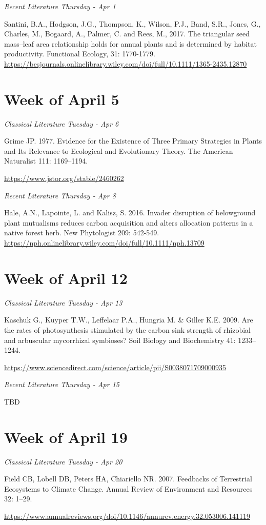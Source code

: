 \documentclass[12pt, notitlepage]{article}   	%
\begin{document}
{\textit{Recent Literature Thursday - Apr 1} \par
Santini, B.A., Hodgson, J.G., Thompson, K., Wilson, P.J., Band, S.R., Jones, G., 
Charles, M., Bogaard, A., Palmer, C. and Rees, M., 2017. 
The triangular seed mass–leaf area relationship holds for annual plants and is determined by habitat productivity. 
Functional Ecology, 31: 1770-1779.
\url{https://besjournals.onlinelibrary.wiley.com/doi/full/10.1111/1365-2435.12870}

\section*{Week of April 5}
\textit{Classical Literature Tuesday - Apr 6} \par
Grime JP. 1977. Evidence for the Existence of Three Primary Strategies in Plants and Its 
Relevance to Ecological and Evolutionary Theory. 
The American Naturalist 111: 1169–1194. \par
\url{https://www.jstor.org/stable/2460262}

\textit{Recent Literature Thursday - Apr 8} \par
Hale, A.N., Lapointe, L. and Kalisz, S. 2016. 
Invader disruption of belowground plant mutualisms reduces carbon acquisition and 
alters allocation patterns in a native forest herb. New Phytologist 209: 542-549.
\url{https://nph.onlinelibrary.wiley.com/doi/full/10.1111/nph.13709}

\section*{Week of April 12}
\textit{Classical Literature Tuesday - Apr 13} \par
Kaschuk G., Kuyper T.W., Leffelaar P.A., Hungria M. & Giller K.E. 2009.
Are the rates of photosynthesis stimulated by the carbon sink strength of 
rhizobial and arbuscular mycorrhizal symbioses? Soil Biology and Biochemistry 41: 1233–1244. \par
\url{https://www.sciencedirect.com/science/article/pii/S0038071709000935}

\textit{Recent Literature Thursday - Apr 15} \par
TBD

\section*{Week of April 19}
\textit{Classical Literature Tuesday - Apr 20} \par
Field CB, Lobell DB, Peters HA, Chiariello NR. 2007. Feedbacks of Terrestrial Ecosystems 
to Climate Change. Annual Review of Environment and Resources 32: 1–29. \par
\url{https://www.annualreviews.org/doi/10.1146/annurev.energy.32.053006.141119}

}
\end{document}
